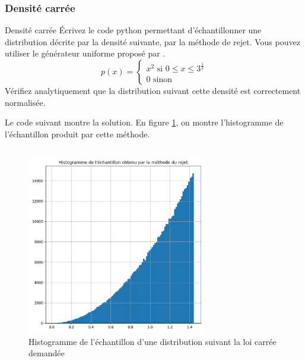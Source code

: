             \subsubsection{Densité carrée}
                \begin{exercise}{Densité carrée}
                    Écrivez le code python permettant d'échantillonner une distribution décrite par la densité suivante, par la méthode de rejet. Vous pouvez utiliser le générateur uniforme proposé par .
                    \begin{equation}
                        p(x) = 
                        \begin{cases}
                            x^2 \text{ si $0\leq x\leq 3^{\frac13}$}\\
                            0 \text{ sinon}
                        \end{cases}
                    \end{equation}
                    Vérifiez analytiquement que la distribution suivant cette densité est correctement normalisée.
                \end{exercise}
                Le code suivant montre la solution. En figure \ref{fig:exercice_rejet_1}, on montre l'histogramme de l'échantillon produit par cette méthode.
                \inputminted{python}{codes/exercice_rejet_1.py}
                \begin{figure}[ht!]
                    \centering
                    \includegraphics[width=0.7\textwidth]{images/exercice_rejet_1.jpg}
                    \caption{Histogramme de l'échantillon d'une distribution suivant la loi carrée demandée}
                    \label{fig:exercice_rejet_1}
                \end{figure}

